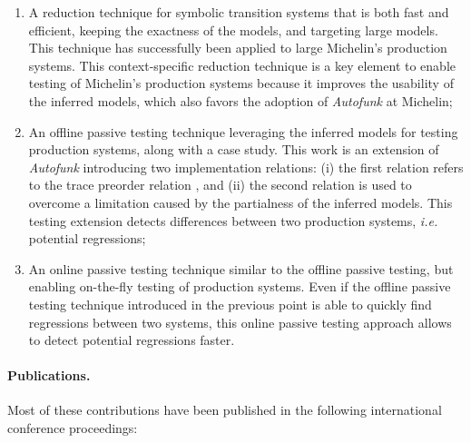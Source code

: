 \begin{enumerate}
    \item A reduction technique for symbolic transition systems
        that is both fast and efficient, keeping the exactness of
        the models, and targeting large models. This technique
        has successfully been applied to large Michelin's
        production systems. This context-specific reduction
        technique is a key element to enable testing of
        Michelin's production systems because it improves the
        usability of the inferred models, which also favors the
        adoption of \emph{Autofunk} at Michelin;

    \item An offline passive testing technique leveraging the
        inferred models for testing production systems, along
        with a case study. This work is an extension of
        \textit{Autofunk} introducing two implementation
        relations: (i) the first relation refers to the trace
        preorder relation \cite{DNH84}, and (ii) the second
        relation is used to overcome a limitation caused by the
        partialness of the inferred models. This testing
        extension detects differences between two production
        systems, \emph{i.e.} potential regressions;

    \item An online passive testing technique similar to the
        offline passive testing, but enabling on-the-fly testing
        of production systems. Even if the offline passive
        testing technique introduced in the previous point is
        able to quickly find regressions between two systems,
        this online passive testing approach allows to detect
        potential regressions faster.
\end{enumerate}

\paragraph{Publications.} Most of these contributions have been
published in the following international conference proceedings:

